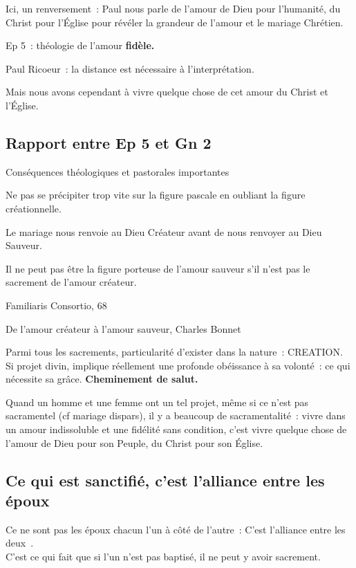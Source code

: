 Ici, un renversement~: Paul nous parle de l'amour de Dieu pour
l'humanité, du Christ pour l'Église pour révéler la grandeur de l'amour
et le mariage Chrétien.

Ep 5~: théologie de l'amour \textbf{fidèle.}

Paul Ricoeur~: la distance est nécessaire à l'interprétation.

Mais nous avons cependant à vivre quelque chose de cet amour du Christ
et l'Église.

\hypertarget{rapport-entre-ep-5-et-gn-2}{%
\subsection{Rapport entre Ep 5 et Gn
2}\label{rapport-entre-ep-5-et-gn-2}}

Conséquences théologiques et pastorales importantes

Ne pas se précipiter trop vite sur la figure pascale en oubliant la
figure créationnelle.

Le mariage nous renvoie au Dieu Créateur avant de nous renvoyer au Dieu
Sauveur.

Il ne peut pas être la figure porteuse de l'amour sauveur s'il n'est pas
le sacrement de l'amour créateur.

Familiaris Consortio, 68

De l'amour créateur à l'amour sauveur, Charles Bonnet

Parmi tous les sacrements, particularité d'exister dans la nature~:
CREATION. Si projet divin, implique réellement une profonde obéissance à
sa volonté~: ce qui nécessite sa grâce. \textbf{Cheminement de salut.}

Quand un homme et une femme ont un tel projet, même si ce n'est pas
sacramentel (cf mariage dispars), il y a beaucoup de sacramentalité~:
vivre dans un amour indissoluble et une fidélité sans condition, c'est
vivre quelque chose de l'amour de Dieu pour son Peuple, du Christ pour
son Église.

\hypertarget{ce-qui-est-sanctifiuxe9-cest-lalliance-entre-les-uxe9poux}{%
\subsection{Ce qui est sanctifié, c'est l'alliance entre les
époux}\label{ce-qui-est-sanctifiuxe9-cest-lalliance-entre-les-uxe9poux}}

Ce ne sont pas les époux chacun l'un à côté de l'autre~: C'est
l'alliance entre les deux~.\\
C'est ce qui fait que si l'un n'est pas baptisé, il ne peut y avoir
sacrement.

